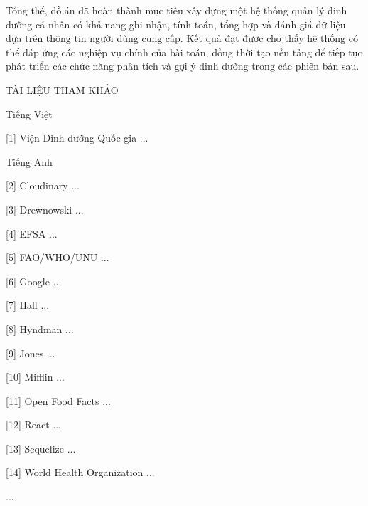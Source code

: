 \documentclass[12pt, a4paper]{report}
\begin{document}
Tổng thể, đồ án đã hoàn thành mục tiêu xây dựng một hệ thống quản lý dinh dưỡng cá nhân có khả năng ghi nhận, tính toán, tổng hợp và đánh giá dữ liệu dựa trên thông tin người dùng cung cấp. Kết quả đạt được cho thấy hệ thống có thể đáp ứng các nghiệp vụ chính của bài toán, đồng thời tạo nền tảng để tiếp tục phát triển các chức năng phân tích và gợi ý dinh dưỡng trong các phiên bản sau.

TÀI LIỆU THAM KHẢO

Tiếng Việt

[1] Viện Dinh dưỡng Quốc gia ...

Tiếng Anh

[2] Cloudinary ...

[3] Drewnowski ...

[4] EFSA ...

[5] FAO/WHO/UNU ...

[6] Google ...

[7] Hall ...

[8] Hyndman ...

[9] Jones ...

[10] Mifflin ...

[11] Open Food Facts ...

[12] React ...

[13] Sequelize ...

[14] World Health Organization ...

...
\end{document}
